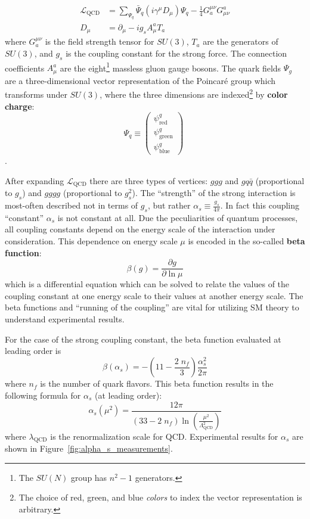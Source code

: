 \begin{align}
    \mathcal{L}_{\mathrm{QCD}} &= \sum_{\Psi_q}  \bar{\Psi}_q  (i \gamma^\mu D_\mu) \Psi_q - \frac{1}{4} G_a^{\mu\nu} G^a_{\mu\nu} \\
    D_\mu &= \partial_\mu - i g_s A_\mu^a T_a
\end{align}
where $G_a^{\mu\nu}$ is the field strength tensor for $SU(3)$, $T_a$ are the generators of $SU(3)$, and $g_s$ is the coupling constant for the strong force.
The connection coefficients $A_\mu^a$ are the eight\footnote{The $SU(N)$ group has $n^2-1$ generators.} massless gluon gauge bosons.
The quark fields $\Psi_g$ are a three-dimensional vector representation of the Poincar\'{e} group which transforms under $SU(3)$, where the three dimensions are indexed\footnote{The choice of red, green, and blue \textit{colors} to index the vector representation is arbitrary.} by \textbf{color charge}:
\begin{equation}
    \Psi_q \equiv 
    \begin{pmatrix}
    \psi^q_{\mathrm{red}} \\
    \psi^q_{\mathrm{green}} \\
    \psi^q_{\mathrm{blue}}
    \end{pmatrix}\;
\end{equation}.

After expanding $\mathcal{L}_{\mathrm{QCD}}$ there are three types of vertices: $ggg$ and $gq\bar{q}$ (proportional to $g_s$) and $gggg$ (proportional to $g_s^2$).
The ``strength'' of the strong interaction is most-often described not in terms of $g_s$, but rather $\alpha_s \equiv \frac{g_s}{4\pi}$.
In fact this coupling ``constant'' $\alpha_s$ is not constant at all.
Due the peculiarities of quantum processes, all coupling constants depend on the energy scale of the interaction under consideration.
This dependence on energy scale $\mu$ is encoded in the so-called \textbf{beta function}:
\begin{equation}
\beta(g) = \frac{\partial g}{\partial \ln \mu}
\end{equation}
which is a differential equation which can be solved to relate the values of the coupling constant at one energy scale to their values at another energy scale.
The beta functions and ``running of the coupling'' are vital for utilizing SM theory to understand experimental results.

For the case of the strong coupling constant, the beta function evaluated at leading order is
\begin{equation}
    \beta(\alpha_s) = -\left(11 - \frac{2\; n_f}{3}\right) \frac{\alpha_s^2}{2\pi}
\end{equation}
where $n_f$ is the number of quark flavors.
This beta function results in the following formula for $\alpha_s$ (at leading order):
\begin{equation}
    \alpha_s(\mu^2) = \frac{12\pi}{(33 - 2\;n_f) \ln (\frac{\mu^2}{\Lambda_{\mathrm{QCD}}^2})}
\end{equation}
where $\lambda_{\mathrm{QCD}}$ is the renormalization scale for QCD.
Experimental results for $\alpha_s$ are shown in Figure~\ref{fig:alpha_s_measurements}.

